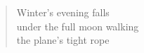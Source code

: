 \documentclass[a4paper,12pt]{article}
\begin{document}
\begin{verse}
  Winter's evening falls \\
  under the full moon walking \\
  the plane's tight rope
\end{verse}
\end{document}
